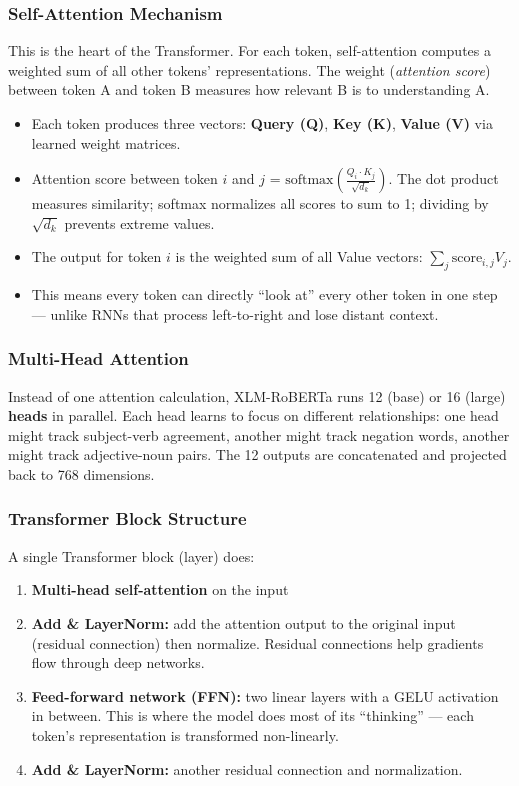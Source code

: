 \subsubsection{Self-Attention Mechanism}

This is the heart of the Transformer. For each token, self-attention computes a weighted sum of all other tokens' representations. The weight (\textit{attention score}) between token A and token B measures how relevant B is to understanding A.

\begin{itemize}[nosep]
    \item Each token produces three vectors: \textbf{Query (Q)}, \textbf{Key (K)}, \textbf{Value (V)} via learned weight matrices.
    \item Attention score between token $i$ and $j$ = $\text{softmax}\left(\frac{Q_i \cdot K_j}{\sqrt{d_k}}\right)$. The dot product measures similarity; softmax normalizes all scores to sum to 1; dividing by $\sqrt{d_k}$ prevents extreme values.
    \item The output for token $i$ is the weighted sum of all Value vectors: $\sum_j \text{score}_{i,j} V_j$.
    \item This means every token can directly ``look at'' every other token in one step --- unlike RNNs that process left-to-right and lose distant context.
\end{itemize}

\subsubsection{Multi-Head Attention}

Instead of one attention calculation, XLM-RoBERTa runs 12 (base) or 16 (large) \textbf{heads} in parallel. Each head learns to focus on different relationships: one head might track subject-verb agreement, another might track negation words, another might track adjective-noun pairs. The 12 outputs are concatenated and projected back to 768 dimensions.

\subsubsection{Transformer Block Structure}

A single Transformer block (layer) does:

\begin{enumerate}[nosep]
    \item \textbf{Multi-head self-attention} on the input
    \item \textbf{Add \& LayerNorm:} add the attention output to the original input (residual connection) then normalize. Residual connections help gradients flow through deep networks.
    \item \textbf{Feed-forward network (FFN):} two linear layers with a GELU activation in between. This is where the model does most of its ``thinking'' --- each token's representation is transformed non-linearly.
    \item \textbf{Add \& LayerNorm:} another residual connection and normalization.
\end{enumerate}

